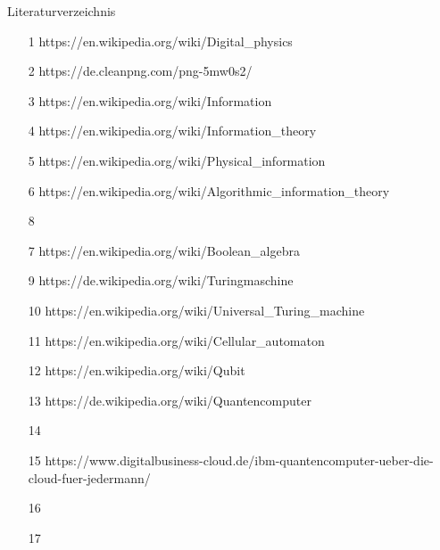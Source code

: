 \documentclass[aspectratio=1610, 9pt]{beamer}
\begin{document}
\begin{frame}{Literaturverzeichnis}
  \begin{itemize}
    \item[1] https://en.wikipedia.org/wiki/Digital\_physics
    \item[2] https://de.cleanpng.com/png-5mw0s2/
    \item[3] https://en.wikipedia.org/wiki/Information
    \item[4] https://en.wikipedia.org/wiki/Information\_theory
    \item[5] https://en.wikipedia.org/wiki/Physical\_information
    \item[6] https://en.wikipedia.org/wiki/Algorithmic\_information\_theory
    \item[8]
    \item[7] https://en.wikipedia.org/wiki/Boolean\_algebra
    \item[9] https://de.wikipedia.org/wiki/Turingmaschine
    \item[10] https://en.wikipedia.org/wiki/Universal\_Turing\_machine
    \item[11] https://en.wikipedia.org/wiki/Cellular\_automaton
    \item[12] https://en.wikipedia.org/wiki/Qubit
    \item[13] https://de.wikipedia.org/wiki/Quantencomputer
    \item[14]
    \item[15] https://www.digitalbusiness-cloud.de/ibm-quantencomputer-ueber-die-cloud-fuer-jedermann/
    \item[16]
    \item[17]
  \end{itemize}

\end{frame}
\end{document}
